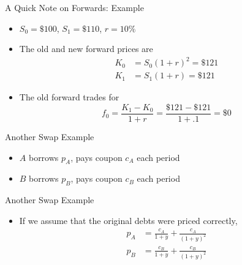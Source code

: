\documentclass{beamer}
\begin{document}
\begin{frame}{A Quick Note on Forwards: Example}
    \begin{itemize}
        \item $S_{0}=\$100$, $S_{1}=\$110$, $r=10\%$
        \item The old and new forward prices are 
            \begin{align}
                K_{0}&=S_{0}(1+r)^{2}=\$121\\
                K_{1}&=S_{1}(1+r)=\$121
            \end{align}
        \item The old forward trades for
            \begin{equation}
                f_{0}=\frac{K_{1}-K_{0}}{1+r}=\frac{\$121-\$121}{1+.1}=\$0
            \end{equation}
    \end{itemize}
\end{frame}

\begin{frame}{Another Swap Example}
    \begin{itemize}
        \item $A$ borrows $p_{A}$, pays coupon $c_{A}$ each period
        \item $B$ borrows $p_{B}$, pays coupon $c_{B}$ each period
    \end{itemize}
\begin{center}
\end{center}
\end{frame}

\begin{frame}{Another Swap Example}
    \begin{itemize}
        \item If we assume that the original debts were priced correctly, 
            \begin{align}
                p_{A}&=\frac{c_{A}}{1+y}+\frac{c_{A}}{(1+y)^{2}}\\
                p_{B}&=\frac{c_{B}}{1+y}+\frac{c_{B}}{(1+y)^{2}} 
            \end{align}
    \end{itemize}
\end{frame}
\end{document}
